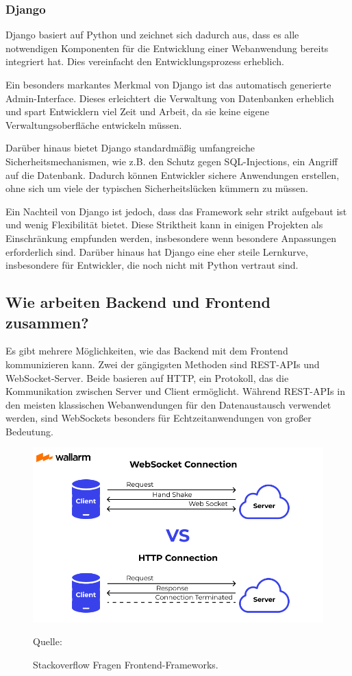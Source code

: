 \documentclass[biblatex]{lni}
\begin{document}
\subsubsection{Django}

Django basiert auf Python und zeichnet sich dadurch aus,
dass es alle notwendigen Komponenten für die Entwicklung einer Webanwendung bereits integriert hat.
Dies vereinfacht den Entwicklungsprozess erheblich.

Ein besonders markantes Merkmal von Django ist das automatisch generierte Admin-Interface.
Dieses erleichtert die Verwaltung von Datenbanken erheblich und spart Entwicklern viel Zeit und Arbeit,
da sie keine eigene Verwaltungsoberfläche entwickeln müssen.

Darüber hinaus bietet Django standardmäßig umfangreiche Sicherheitsmechanismen,
wie z.B. den Schutz gegen SQL-Injections, ein Angriff auf die Datenbank.
Dadurch können Entwickler sichere Anwendungen erstellen,
ohne sich um viele der typischen Sicherheitslücken kümmern zu müssen.

Ein Nachteil von Django ist jedoch,
dass das Framework sehr strikt aufgebaut ist und wenig Flexibilität bietet.
Diese Striktheit kann in einigen Projekten als Einschränkung empfunden werden,
insbesondere wenn besondere Anpassungen erforderlich sind.
Darüber hinaus hat Django eine eher steile Lernkurve, insbesondere für Entwickler, die noch nicht mit Python vertraut sind.

\subsection{Wie arbeiten Backend und Frontend zusammen?}

Es gibt mehrere Möglichkeiten, wie das Backend mit dem Frontend kommunizieren kann.
Zwei der gängigsten Methoden sind REST-APIs und WebSocket-Server.
Beide basieren auf HTTP, ein Protokoll, das die Kommunikation zwischen Server und Client ermöglicht.
Während REST-APIs in den meisten klassischen Webanwendungen für den Datenaustausch verwendet werden,
sind WebSockets besonders für Echtzeitanwendungen von großer Bedeutung.

\begin{figure}
  \centering
  \includegraphics[width=.8\textwidth]{communication}
  \caption{Stackoverflow Fragen Frontend-Frameworks.}
  \label{fig:communication}
  \vspace{-0.3cm}
  \begin{center}
    \footnotesize Quelle: \cite{WebCon}
  \end{center}
\end{figure}
\end{document}
